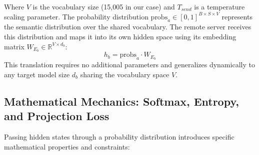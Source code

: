 \documentclass{article}
\begin{document}
Where $V$ is the vocabulary size (15,005 in our case) and $T_{send}$ is a temperature scaling parameter. The probability distribution $\text{probs}_a \in [0, 1]^{B \times S \times V}$ represents the semantic distribution over the shared vocabulary. The remote server receives this distribution and maps it into its own hidden space using its embedding matrix $W_{E_b} \in \mathbb{R}^{V \times d_b}$:
\begin{equation}
h_b = \text{probs}_a \cdot W_{E_b}
\end{equation}
This translation requires no additional parameters and generalizes dynamically to any target model size $d_b$ sharing the vocabulary space $V$.

\subsection{Mathematical Mechanics: Softmax, Entropy, and Projection Loss}
Passing hidden states through a probability distribution introduces specific mathematical properties and constraints:
\end{document}
